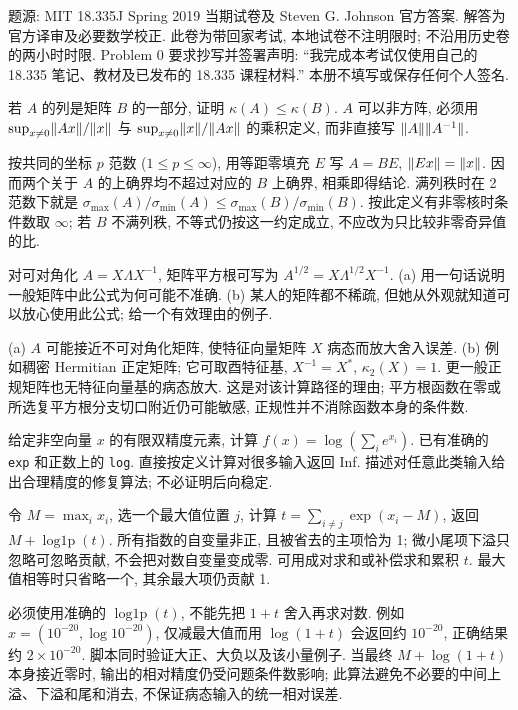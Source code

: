 \label{ass:e2019}
题源: MIT 18.335J Spring 2019 当期试卷及 Steven G. Johnson 官方答案. 解答为官方译审及必要数学校正. 此卷为带回家考试, 本地试卷不注明限时; 不沿用历史卷的两小时时限. Problem 0 要求抄写并签署声明: ``我完成本考试仅使用自己的 18.335 笔记、教材及已发布的 18.335 课程材料.'' 本册不填写或保存任何个人签名.
\begin{exercise}\label{e2019:q1}
若 $A$ 的列是矩阵 $B$ 的一部分, 证明 $\kappa(A)\le\kappa(B)$. $A$ 可以非方阵, 必须用 $\sup_{x\ne0}\lVert Ax\rVert/\lVert x\rVert$ 与 $\sup_{x\ne0}\lVert x\rVert/\lVert Ax\rVert$ 的乘积定义, 而非直接写 $\lVert A\rVert\lVert A^{-1}\rVert$.
\end{exercise}
\begin{solution}
按共同的坐标 $p$ 范数 ($1\le p\le\infty$), 用等距零填充 $E$ 写 $A=BE$, $\lVert Ex\rVert=\lVert x\rVert$. 因而两个关于 $A$ 的上确界均不超过对应的 $B$ 上确界, 相乘即得结论. 满列秩时在 2 范数下就是 $\sigma_{\max}(A)/\sigma_{\min}(A)\le\sigma_{\max}(B)/\sigma_{\min}(B)$. 按此定义有非零核时条件数取 $\infty$; 若 $B$ 不满列秩, 不等式仍按这一约定成立, 不应改为只比较非零奇异值的比.
\end{solution}
\begin{exercise}\label{e2019:q2}
对可对角化 $A=X\Lambda X^{-1}$, 矩阵平方根可写为 $A^{1/2}=X\Lambda^{1/2}X^{-1}$.
(a) 用一句话说明一般矩阵中此公式为何可能不准确.
(b) 某人的矩阵都不稀疏, 但她从外观就知道可以放心使用此公式; 给一个有效理由的例子.
\end{exercise}
\begin{solution}
(a) $A$ 可能接近不可对角化矩阵, 使特征向量矩阵 $X$ 病态而放大舍入误差.
(b) 例如稠密 Hermitian 正定矩阵; 它可取酉特征基, $X^{-1}=X^*$, $\kappa_2(X)=1$. 更一般正规矩阵也无特征向量基的病态放大. 这是对该计算路径的理由; 平方根函数在零或所选复平方根分支切口附近仍可能敏感, 正规性并不消除函数本身的条件数.
\end{solution}
\begin{exercise}\label{e2019:q3}
给定非空向量 $x$ 的有限双精度元素, 计算 $f(x)=\log(\sum_i e^{x_i})$. 已有准确的 \texttt{exp} 和正数上的 \texttt{log}. 直接按定义计算对很多输入返回 Inf. 描述对任意此类输入给出合理精度的修复算法; 不必证明后向稳定.
\end{exercise}
\begin{solution}
令 $M=\max_i x_i$, 选一个最大值位置 $j$, 计算 $t=\sum_{i\ne j}\exp(x_i-M)$, 返回 $M+\operatorname{log1p}(t)$. 所有指数的自变量非正, 且被省去的主项恰为 1; 微小尾项下溢只忽略可忽略贡献, 不会把对数自变量变成零. 可用成对求和或补偿求和累积 $t$. 最大值相等时只省略一个, 其余最大项仍贡献 1.

必须使用准确的 $\operatorname{log1p}(t)$, 不能先把 $1+t$ 舍入再求对数. 例如 $x=(10^{-20},\log10^{-20})$, 仅减最大值而用 $\log(1+t)$ 会返回约 $10^{-20}$, 正确结果约 $2\times10^{-20}$. 脚本同时验证大正、大负以及该小量例子. 当最终 $M+\log(1+t)$ 本身接近零时, 输出的相对精度仍受问题条件数影响; 此算法避免不必要的中间上溢、下溢和尾和消去, 不保证病态输入的统一相对误差.
\end{solution}
